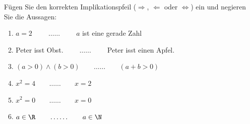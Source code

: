 \begin{ExerciseBlock}
Fügen Sie den korrekten Implikationspfeil ($\Rightarrow$, $\Leftarrow$ oder $\Leftrightarrow$) ein und negieren Sie die Aussagen:
\begin{enumerate}[label=\alph*)]
	\item $\displaystyle a = 2$ $\qquad \ldots\ldots \qquad$ $a$ ist eine gerade Zahl
	\item Peter isst Obst. $\qquad \ldots\ldots \qquad$ Peter isst einen Apfel.
	\item $\displaystyle(a > 0) \wedge (b > 0) \qquad \ldots\ldots \qquad (a + b > 0)$
	\item $\displaystyle x^2=4 \qquad \ldots\ldots \qquad x=2$	
	\item $\displaystyle x^2=0 \qquad \ldots\ldots \qquad x=0$
	\item $\displaystyle a \in \R \qquad \ldots\ldots \qquad a \in \N$
\end{enumerate}

\end{ExerciseBlock}
